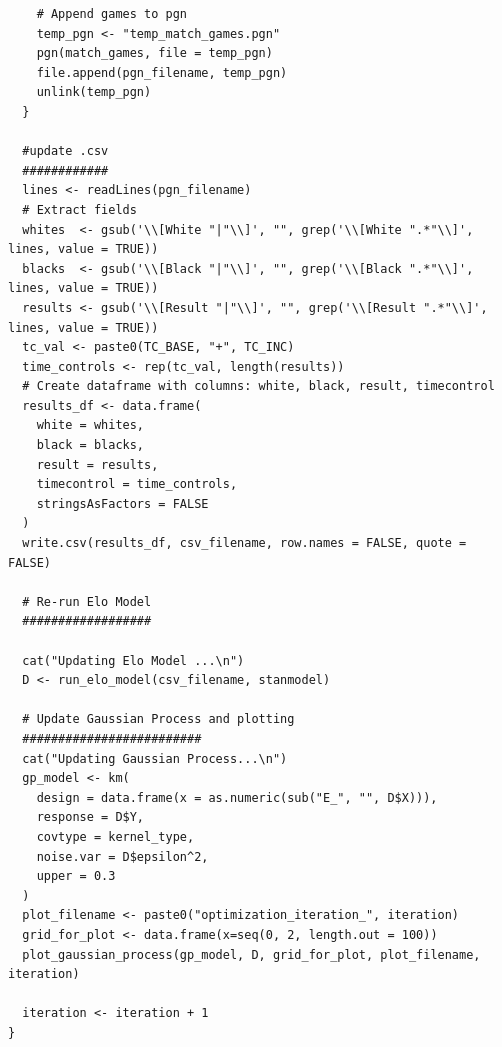 \documentclass{article}
\begin{document}
\begin{verbatim}
    # Append games to pgn
    temp_pgn <- "temp_match_games.pgn"
    pgn(match_games, file = temp_pgn)
    file.append(pgn_filename, temp_pgn)
    unlink(temp_pgn)
  }
  
  #update .csv
  ############
  lines <- readLines(pgn_filename)
  # Extract fields
  whites  <- gsub('\\[White "|"\\]', "", grep('\\[White ".*"\\]', lines, value = TRUE))
  blacks  <- gsub('\\[Black "|"\\]', "", grep('\\[Black ".*"\\]', lines, value = TRUE))
  results <- gsub('\\[Result "|"\\]', "", grep('\\[Result ".*"\\]', lines, value = TRUE))
  tc_val <- paste0(TC_BASE, "+", TC_INC)
  time_controls <- rep(tc_val, length(results))
  # Create dataframe with columns: white, black, result, timecontrol
  results_df <- data.frame(
    white = whites, 
    black = blacks, 
    result = results, 
    timecontrol = time_controls, 
    stringsAsFactors = FALSE
  )
  write.csv(results_df, csv_filename, row.names = FALSE, quote = FALSE)
  
  # Re-run Elo Model
  ##################
  
  cat("Updating Elo Model ...\n")
  D <- run_elo_model(csv_filename, stanmodel)
  
  # Update Gaussian Process and plotting
  #########################
  cat("Updating Gaussian Process...\n")
  gp_model <- km(
    design = data.frame(x = as.numeric(sub("E_", "", D$X))), 
    response = D$Y, 
    covtype = kernel_type, 
    noise.var = D$epsilon^2,
    upper = 0.3
  )
  plot_filename <- paste0("optimization_iteration_", iteration)
  grid_for_plot <- data.frame(x=seq(0, 2, length.out = 100))
  plot_gaussian_process(gp_model, D, grid_for_plot, plot_filename, iteration)
  
  iteration <- iteration + 1
}
\end{verbatim}
\end{document}
